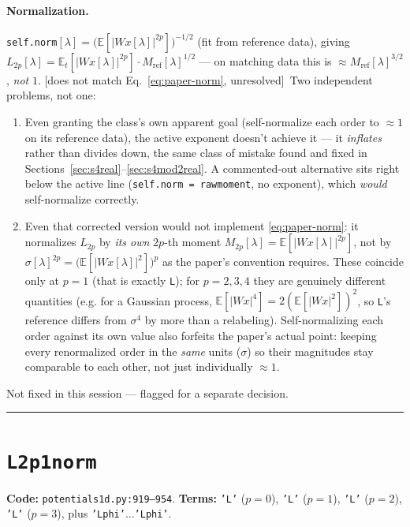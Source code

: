 \documentclass[11pt]{article}
\newcommand{\E}{\mathbb{E}}
\newcommand{\Wx}{W\!x}
\newcommand{\code}[1]{\texttt{#1}}
\renewcommand{\_}{\origunderscore\allowbreak} %
\newcommand{\suspect}{\textcolor{red!60!black}{[does not match Eq.~\ref{eq:paper-norm}, unresolved]}}
\begin{document}
\paragraph{Normalization.} \code{self.norm}$[\lambda] = \big(\E[|\Wx[\lambda]|^{2p}]\big)^{-1/2}$
(fit from reference data), giving
$L_{2p}[\lambda] = \E_t[|\Wx[\lambda]|^{2p}] \cdot M_{\mathrm{ref}}[\lambda]^{1/2}$
— on matching data this is $\approx M_\mathrm{ref}[\lambda]^{3/2}$, \emph{not}
$1$. \suspect\ Two independent problems, not one:
\begin{enumerate}
  \item Even granting the class's own apparent goal (self-normalize each order
        to $\approx 1$ on its reference data), the active exponent doesn't
        achieve it — it \emph{inflates} rather than divides down, the same
        class of mistake found and fixed in Sections~\ref{sec:s4real}--\ref{sec:s4mod2real}.
        A commented-out alternative sits right below the active line
        (\code{self.norm = raw\_moment}, no exponent), which \emph{would}
        self-normalize correctly.
  \item Even that corrected version would not implement \eqref{eq:paper-norm}:
        it normalizes $L_{2p}$ by \emph{its own} $2p$-th moment
        $M_{2p}[\lambda]=\E[|\Wx[\lambda]|^{2p}]$, not by $\sigma[\lambda]^{2p}=\big(\E[|\Wx[\lambda]|^2]\big)^p$
        as the paper's convention requires. These coincide only at $p=1$ (that
        is exactly \code{L\_2}); for $p=2,3,4$ they are genuinely different
        quantities (e.g. for a Gaussian process, $\E[|\Wx|^4]=2(\E[|\Wx|^2])^2$,
        so \code{L\_4}'s reference differs from $\sigma^4$ by more than a
        relabeling). Self-normalizing each order against its own value also
        forfeits the paper's actual point: keeping every renormalized order in
        the \emph{same} units ($\sigma$) so their magnitudes stay comparable
        to each other, not just individually $\approx 1$.
\end{enumerate}
Not fixed in this session — flagged for a separate decision.

\bigskip
\hrule
\bigskip

\section{\code{L2p1\_norm}}
\label{sec:l2p1}
\textbf{Code:} \code{potentials\_1d.py:919--954}. \quad
\textbf{Terms:} \code{'L\_1'} ($p{=}0$), \code{'L\_3'} ($p{=}1$), \code{'L\_5'}
($p{=}2$), \code{'L\_7'} ($p{=}3$), plus \code{'L\_1\_phi'}...\code{'L\_7\_phi'}.
\end{document}
